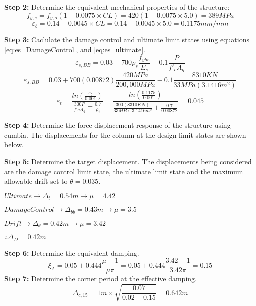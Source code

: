 \textbf{Step 2:} Determine the equivalent mechanical properties of the structure:
\begin{displaymath}
    f_{y,e}=f_{y,o}(1-0.0075\times CL)=420(1-0.0075\times 5.0)=389 MPa
\end{displaymath}
\begin{displaymath}
    \varepsilon_{b}=0.14-0.0045 \times CL = 0.14-0.0045 \times 5.0 = 0.1175 mm/mm
\end{displaymath}

\textbf{Step 3:} Caclulate the damage control and ultimate limit states using equations \ref{eq:es_DamageControl}, and \ref{eq:es_ultimate}.
\begin{displaymath}
    \varepsilon_{s,BB}=0.03+700\rho_{s}  \frac{f_{yhe}}{E_{s}} -0.1\frac{P}{f'_{c}A_{g}}
\end{displaymath}
\begin{displaymath}
    \varepsilon_{s,BB}=0.03+700 (0.00872)  \frac{420 MPa}{200,000 MPa} -0.1\frac{8310 KN}{33MPa (3.1416 m^2)}
\end{displaymath}
\begin{displaymath}
    \varepsilon_{t}=\frac{ln(\frac{\varepsilon_{b}}{0.001})}{\frac{300P}{f'c A_{g}}+\frac{0.7}{\rho_{t}}}=\frac{ln(\frac{0.1175}{0.001})}{\frac{300(8310KN)}{33MPa \cdot 3.1416 m^2}+\frac{0.7}{0.00872}}=0.045
\end{displaymath}

\textbf{Step 4:} Determine the force-displacement response of the structure using cumbia. The displacements for the column at the design limit states are shown below. 


\textbf{Step 5:} Determine the target displacement. The displacements being considered are the damage control limit state, the ultimate limit state and the maximum allowable drift set to $\theta=0.035$.

$Ultimate \to \Delta_{t}=0.54 m \to \mu=4.42$

$Damage Control \to \Delta_{bb} =0.43 m \to \mu=3.5$

$Drift \to \Delta_{\theta}=0.42 m \to \mu=3.42$

$\therefore \Delta_{D}=0.42m$

\textbf{Step 6:} Determine the equivalent damping.
\begin{displaymath}
    \xi_{A}=0.05+0.444\frac{\mu-1}{\mu\pi}=0.05+0.444\frac{3.42-1}{3.42\pi}=0.15
\end{displaymath}
\textbf{Step 7:} Determine the corner period at the effective damping.
\begin{displaymath}
    \Delta_{c,15}=1 m \times \sqrt{\frac{0.07}{0.02+0.15}} = 0.642 m
\end{displaymath}

